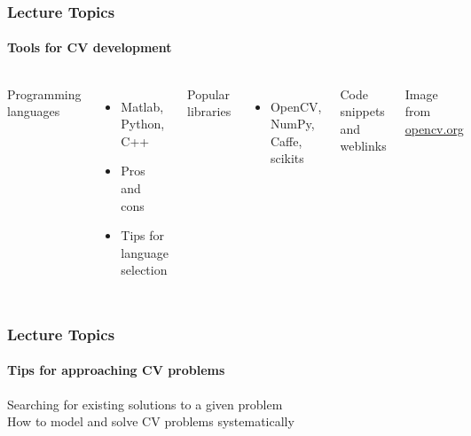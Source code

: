 \documentclass[xetex,professionalfont]{beamer}
\begin{document}

\begin{frame}
\frametitle{Lecture Topics}
\framesubtitle{Tools for CV development}

\begin{columns}

Programming languages
\begin{itemize}
	\item Matlab, Python, C++
	\item Pros and cons
	\item Tips for language selection
\end{itemize}

\bigskip
Popular libraries
\begin{itemize}
	\item OpenCV, NumPy, Caffe, scikits
\end{itemize}

\bigskip
Code snippets and weblinks


\begin{center}
{
	{\centering Image from \url{opencv.org}}}
\end{center}

\end{columns}

\end{frame}


\begin{frame}
\frametitle{Lecture Topics}
\framesubtitle{Tips for approaching CV problems}

Searching for existing solutions to a given problem \\\medskip
How to model and solve CV problems systematically

\bigskip
\begin{center}
\end{center}

\end{frame}
\end{document}
